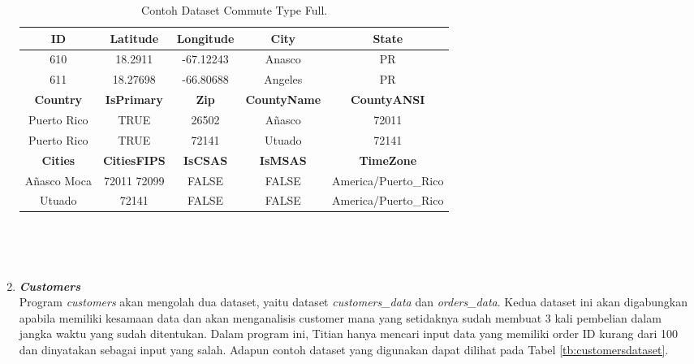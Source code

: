 \begin{enumerate}
            
            \begin{longtable}{|c|c|c|c|c|}
                  \caption{Contoh Dataset Commute Type Full.}
                  \label{tb:commutetypefulldataset} \\
                  \hline
                  \rowcolor[HTML]{C0C0C0}
                  \textbf{ID} & \textbf{Latitude} & \textbf{Longitude} & \textbf{City} & \textbf{State}\\
                  \hline
                  610 & 18.2911 & -67.12243 & Anasco & PR \\
                  611 & 18.27698 & -66.80688 & Angeles & PR \\
                  \hline
                  \rowcolor[HTML]{C0C0C0}
                  \textbf{Country} & \textbf{IsPrimary} & \textbf{Zip} & \textbf{CountyName} & \textbf{CountyANSI}\\
                  \hline
                  Puerto Rico & TRUE & 26502 & Añasco & 72011 \\
                  Puerto Rico & TRUE & 72141 & Utuado & 72141 \\

                  \hline
                  \rowcolor[HTML]{C0C0C0}
                  \textbf{Cities} & \textbf{CitiesFIPS} & \textbf{IsCSAS} & \textbf{IsMSAS} & \textbf{TimeZone}\\
                  \hline
                  Añasco \textbar{} Moca  & 72011 \textbar{} 72099  & FALSE & FALSE & America/Puerto\_Rico \\
                  Utuado & 72141 & FALSE & FALSE & America/Puerto\_Rico \\
                  \hline
            \end{longtable}

      \

      \
      \item \emph{\textbf{Customers}} \\
            Program \emph{customers} akan mengolah dua dataset, yaitu dataset \emph{customers\_data} dan \emph{orders\_data}. Kedua dataset ini akan digabungkan apabila memiliki kesamaan data dan akan menganalisis customer mana yang setidaknya sudah membuat 3 kali pembelian dalam jangka waktu yang sudah ditentukan. Dalam program ini, Titian hanya mencari input data yang memiliki order ID kurang dari 100 dan dinyatakan sebagai input yang salah.
            Adapun contoh dataset yang digunakan dapat 
            dilihat pada Tabel \ref{tb:customersdataset}.


\end{enumerate}
